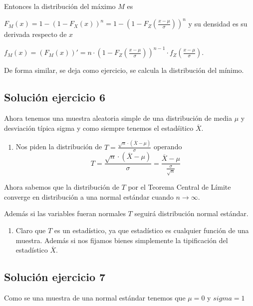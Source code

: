 \documentclass[
]{article}
\providecommand{\tightlist}{%
  \setlength{\itemsep}{0pt}\setlength{\parskip}{0pt}}
\begin{document}
Entonces la distribución del máximo \(M\) es

\(F_M(x)=1-(1-F_{X}(x))^n=1-(1-F_{Z}(\frac{x-\mu}{\sigma}))^n\) y su
densidad es su derivada respecto de \(x\)

\(f_M(x)=\left(F_M(x)\right)'=n\cdot (1-F_{Z}(\frac{x-\mu}{\sigma}))^{n-1}\cdot f_{Z}(\frac{x-\mu}{\sigma}).\)

De forma similar, se deja como ejercicio, se calcula la distribución del
mínimo.

\hypertarget{soluciuxf3n-ejercicio-6}{%
\subsection{Solución ejercicio 6}\label{soluciuxf3n-ejercicio-6}}

Ahora tenemos una muestra aleatoria simple de una distribución de media
\(\mu\) y desviación típica sigma y como siempre tenemos el estadśitico
\(\overline{X}\).

\begin{enumerate}
\def\labelenumi{\alph{enumi}.}
\tightlist
\item
  Nos piden la distribución de
  \(T=\frac{\sqrt{n}\cdot (\overline{X}-\mu)}{\sigma}\) operando
  \[T=\frac{\sqrt{n}\cdot(\overline{X}-\mu)}{\sigma}=
  \frac{\overline{X}-\mu}{\frac{\sigma}{\sqrt{n}}}\]
\end{enumerate}

Ahora sabemos que la distribución de \(T\) por el Teorema Central de
Límite converge en distribución a una normal estándar cuando
\(n\to\infty\).

Además si las variables fueran normales \(T\) seguirá distribución
normal estándar.

\begin{enumerate}
\def\labelenumi{\alph{enumi}.}
\setcounter{enumi}{1}
\tightlist
\item
  Claro que \(T\) es un estadístico, ya que estadístico es cualquier
  función de una muestra. Además si nos fijamos bienes simplemente la
  tipificación del estadístico \(\overline{X}\).
\end{enumerate}

\hypertarget{soluciuxf3n-ejercicio-7}{%
\subsection{Solución ejercicio 7}\label{soluciuxf3n-ejercicio-7}}

Como se una muestra de una normal estándar tenemos que \(\mu=0\) y
\(sigma=1\)
\end{document}
